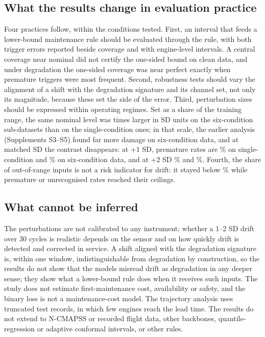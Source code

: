 \subsection{What the results change in evaluation practice}
Four practices follow, within the conditions tested. First, an interval that feeds a lower-bound maintenance rule should be evaluated through the rule, with both trigger errors reported beside coverage and with engine-level intervals. A central coverage near nominal did not certify the one-sided bound on clean data, and under degradation the one-sided coverage was near perfect exactly when premature triggers were most frequent. Second, robustness tests should vary the alignment of a shift with the degradation signature and its channel set, not only its magnitude, because these set the side of the error. Third, perturbation sizes should be expressed within operating regimes. Set as a share of the training range, the same nominal level was \RVRatioSix{} times larger in SD units on the six-condition sub-datasets than on the single-condition ones; in that scale, the earlier analysis (Supplements S3--S5) found far more damage on six-condition data, and at matched SD the contrast disappears: at $+1$ SD, premature rates are \RVPremOneSingle\% on single-condition and \RVPremOneSix\% on six-condition data, and at $+2$ SD \RVPremTwoSingle\% and \RVPremTwoSix\%. Fourth, the share of out-of-range inputs is not a risk indicator for drift: it stayed below \RVFoobTwo\% while premature or unrecognised rates reached their ceilings.

\subsection{What cannot be inferred}
The perturbations are not calibrated to any instrument; whether a 1--2 SD drift over 30 cycles is realistic depends on the sensor and on how quickly drift is detected and corrected in service. A shift aligned with the degradation signature is, within one window, indistinguishable from degradation by construction, so the results do not show that the models misread drift as degradation in any deeper sense; they show what a lower-bound rule does when it receives such inputs. The study does not estimate first-maintenance cost, availability or safety, and the binary loss is not a maintenance-cost model. The trajectory analysis uses truncated test records, in which few engines reach the lead time. The results do not extend to N-CMAPSS or recorded flight data, other backbones, quantile-regression or adaptive conformal intervals, or other rules.

